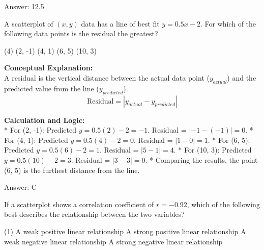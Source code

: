 \documentclass[11pt,paper=a4,answers]{exam}
\begin{document}
\begin{questions}
\begin{solution}
\vspace{30pt}

Answer: \colorbox{yellow!100}{12.5}
\end{solution}

\vspace{60pt}

\question
A scatterplot of $(x, y)$ data has a line of best fit $y = 0.5x - 2$. For which of the following data points is the residual the greatest?
\begin{tasks}(4)
    \task (2, -1)
    \task (4, 1)
    \task (6, 5)
    \task (10, 3)
\end{tasks}

\begin{solution}
\textbf{Conceptual Explanation:} \\
A residual is the vertical distance between the actual data point ($y_{actual}$) and the predicted value from the line ($y_{predicted}$). 
\[ \text{Residual} = |y_{actual} - y_{predicted}| \]

\vspace{30pt}

\textbf{Calculation and Logic:} \\
* For (2, -1): Predicted $y = 0.5(2) - 2 = -1$. Residual = $|-1 - (-1)| = 0$.
* For (4, 1): Predicted $y = 0.5(4) - 2 = 0$. Residual = $|1 - 0| = 1$.
* For (6, 5): Predicted $y = 0.5(6) - 2 = 1$. Residual = $|5 - 1| = 4$.
* For (10, 3): Predicted $y = 0.5(10) - 2 = 3$. Residual = $|3 - 3| = 0$.
* Comparing the results, the point (6, 5) is the furthest distance from the line.

\vspace{30pt}

Answer: \colorbox{yellow!100}{C}
\end{solution}

\vspace{60pt}

\question
If a scatterplot shows a correlation coefficient of $r = -0.92$, which of the following best describes the relationship between the two variables?
\begin{tasks}(1)
    \task A weak positive linear relationship
    \task A strong positive linear relationship
    \task A weak negative linear relationship
    \task A strong negative linear relationship
\end{tasks}


\end{questions}
\end{document}
